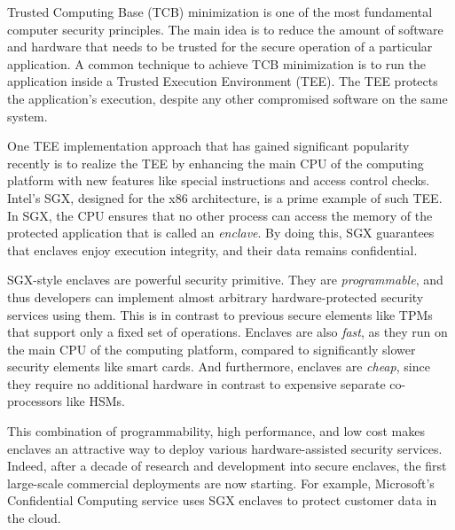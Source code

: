 
\vspace{10pt}


Trusted Computing Base (TCB) minimization is one of the most fundamental computer security principles. The main idea is to reduce the amount of software and hardware that needs to be trusted for the secure operation of a particular application. A common technique to achieve TCB minimization is to run the application inside a Trusted Execution Environment (TEE). The TEE protects the application's execution, despite any other compromised software on the same system.

One TEE implementation approach that has gained significant popularity recently is to realize the TEE by enhancing the main CPU of the computing platform with new features like special instructions and access control checks. Intel's SGX, designed for the x86 architecture, is a prime example of such TEE. In SGX, the CPU ensures that no other process can access the memory of the protected application that is called an \emph{enclave}. By doing this, SGX guarantees that enclaves enjoy execution integrity, and their data remains confidential.  


SGX-style enclaves are powerful security primitive. They are \emph{programmable}, and thus developers can implement almost arbitrary hardware-protected security services using them. This is in contrast to previous secure elements like TPMs that support only a fixed set of operations. Enclaves are also \emph{fast}, as they run on the main CPU of the computing platform, compared to significantly slower security elements like smart cards. And furthermore, enclaves are \emph{cheap}, since they require no additional hardware in contrast to expensive separate co-processors like HSMs. 

This combination of programmability, high performance, and low cost makes enclaves an attractive way to deploy various hardware-assisted security services. Indeed, after a decade of research and development into secure enclaves, the first large-scale commercial deployments are now starting. For example, Microsoft's Confidential Computing service uses SGX enclaves to protect customer data in the cloud.


